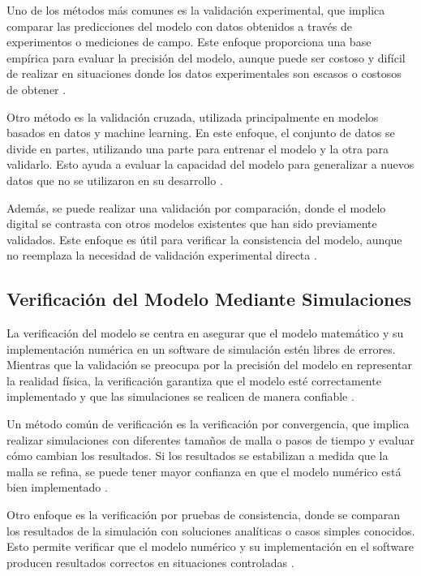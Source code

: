 Uno de los métodos más comunes es la validación experimental, que implica comparar las predicciones del modelo con datos obtenidos a través de experimentos o mediciones de campo. Este enfoque proporciona una base empírica para evaluar la precisión del modelo, aunque puede ser costoso y difícil de realizar en situaciones donde los datos experimentales son escasos o costosos de obtener \cite{roache1998verification}.

Otro método es la validación cruzada, utilizada principalmente en modelos basados en datos y machine learning. En este enfoque, el conjunto de datos se divide en partes, utilizando una parte para entrenar el modelo y la otra para validarlo. Esto ayuda a evaluar la capacidad del modelo para generalizar a nuevos datos que no se utilizaron en su desarrollo \cite{montgomery2012applied}.

Además, se puede realizar una validación por comparación, donde el modelo digital se contrasta con otros modelos existentes que han sido previamente validados. Este enfoque es útil para verificar la consistencia del modelo, aunque no reemplaza la necesidad de validación experimental directa \cite{karniadakis2021physics}.

\subsection{Verificación del Modelo Mediante Simulaciones}

La verificación del modelo se centra en asegurar que el modelo matemático y su implementación numérica en un software de simulación estén libres de errores. Mientras que la validación se preocupa por la precisión del modelo en representar la realidad física, la verificación garantiza que el modelo esté correctamente implementado y que las simulaciones se realicen de manera confiable \cite{oberkampf2010verification}.

Un método común de verificación es la verificación por convergencia, que implica realizar simulaciones con diferentes tamaños de malla o pasos de tiempo y evaluar cómo cambian los resultados. Si los resultados se estabilizan a medida que la malla se refina, se puede tener mayor confianza en que el modelo numérico está bien implementado \cite{roache1998verification}.

Otro enfoque es la verificación por pruebas de consistencia, donde se comparan los resultados de la simulación con soluciones analíticas o casos simples conocidos. Esto permite verificar que el modelo numérico y su implementación en el software producen resultados correctos en situaciones controladas \cite{zienkiewicz2005finite}.

